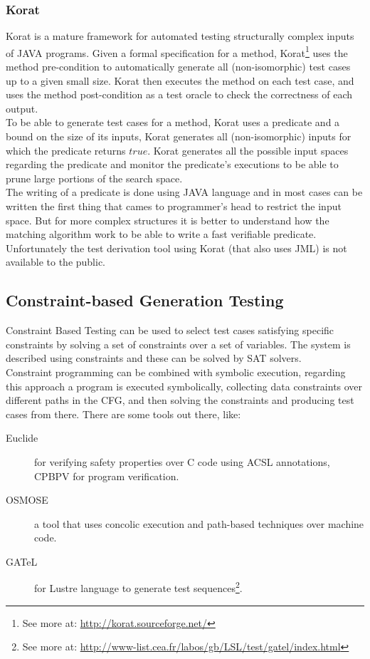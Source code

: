 \subsubsection{Korat}
Korat\cite{Boyapati02korat:automated} is a mature framework for automated testing structurally complex inputs of JAVA programs.
Given a formal specification for a method, Korat\footnote{See more at: \url{http://korat.sourceforge.net/}} uses the method pre-condition
to automatically generate all (non-isomorphic) test cases up to a given small size.
Korat then executes the method on each test case, and uses the method post-condition as a test oracle to check the correctness of each output.\\
To be able to generate test cases for a method, Korat uses a predicate and a bound on the size of its inputs,
Korat generates all (non-isomorphic) inputs for which the predicate returns $true$.
Korat generates all the possible input spaces regarding the predicate and monitor the predicate's executions to be able to prune large portions of the search space.\\
\indent The writing of a predicate is done using JAVA language and in most cases can be written the first thing that cames to programmer's head to restrict the input space.
But for more complex structures it is better to understand how the matching algorithm work to be able to write a fast verifiable predicate.\\
Unfortunately the test derivation tool using Korat (that also uses JML) is not available to the public.

\subsection{Constraint-based Generation Testing}
Constraint Based Testing\cite{DeMillo91constraint-basedautomatic} can be used to select test cases satisfying specific constraints by
solving a set of constraints over a set of variables. The system is described using constraints and these can be solved by SAT solvers.\\
Constraint programming can be combined with symbolic execution, regarding this approach a program is executed symbolically,
collecting data constraints over different paths in the CFG, and then solving the constraints and producing test cases from there.
There are some tools out there, like:

\begin{description}
\item[Euclide] for verifying safety properties over C code using ACSL annotations, CPBPV for program verification.
\item[OSMOSE] a tool that uses concolic execution and path-based techniques over machine code.
\item[GATeL] for Lustre language to generate test sequences\footnote{See more at: \url{http://www-list.cea.fr/labos/gb/LSL/test/gatel/index.html}}.
\end{description}

